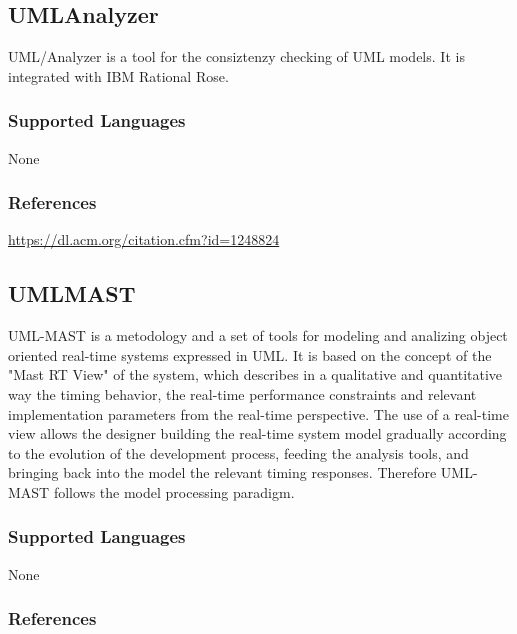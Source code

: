 \subsection{UMLAnalyzer}
\label{subsecT:UMLAnalyzer}


UML/Analyzer is a tool for the consiztenzy checking of UML models.
It is integrated with IBM Rational Rose.

\subsubsection{Supported Languages}

None


\subsubsection{References}

\url{https://dl.acm.org/citation.cfm?id=1248824}



\subsection{UMLMAST}
\label{subsecT:UMLMAST}


UML-MAST is a metodology and a set of tools for modeling and analizing object oriented real-time systems expressed in UML. It is based on the concept of the "Mast RT View" of the system, which describes in a qualitative and quantitative way the timing behavior, the real-time performance constraints and relevant implementation parameters from the real-time perspective. The use of a real-time view allows the designer building the real-time system model gradually according to the evolution of the development process, feeding the analysis tools, and bringing back into the model the relevant timing responses. Therefore UML-MAST follows the model processing paradigm.

\subsubsection{Supported Languages}

None


\subsubsection{References}





